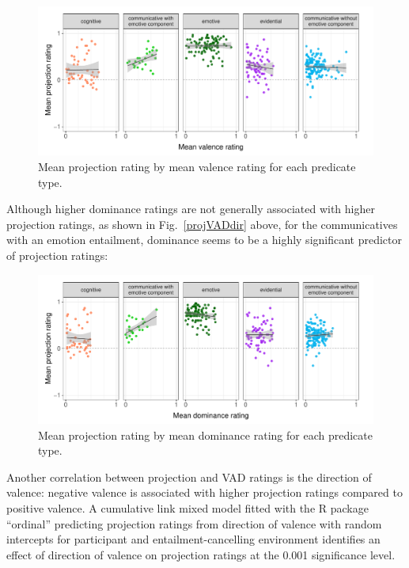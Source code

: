 \documentclass[11pt,fleqn]{article}
\newcommand{\figref}[1]{Fig.~\ref{#1}}
\newcommand{\6}{\mbox{$[\hspace*{-.6mm}[$}}
\newcommand{\9}{\mbox{$]\hspace*{-.6mm}]$}}
\begin{document}
\begin{figure}[H]
	\centering
	\includegraphics[width=1\textwidth]{projection-by-valence-faceted2}
	\caption{Mean projection rating by mean valence rating for each predicate type.}
	\label{projvalfac}
\end{figure}

Although higher dominance ratings are not generally associated with higher projection ratings, as shown in \figref{projVADdir} above, for the communicatives with an emotion entailment, dominance seems to be a highly significant predictor of projection ratings:
	
\begin{figure}[H]
	\centering
	\includegraphics[width=1\textwidth]{projection-by-dominance-faceted2}
	\caption{Mean projection rating by mean dominance rating for each predicate type.}
	\label{projdomfac}
\end{figure}

Another correlation between projection and VAD ratings is the direction of valence: negative valence is associated with higher projection ratings compared to positive valence. A cumulative link mixed model fitted with the R package ``ordinal” predicting projection ratings from direction of valence with random intercepts for participant and entailment-cancelling environment identifies an effect of direction of valence on projection ratings at the 0.001 significance level.
\end{document}
